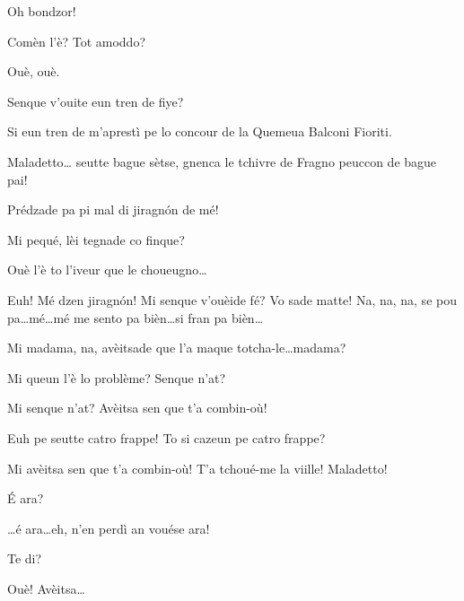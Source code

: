 \begin{drama}
\Saventaspeaks Oh bondzor!

\Cimaspeaks Comèn l'è? Tot amoddo?

\Saventaspeaks Ouè, ouè.

\Cimaspeaks Senque v'ouite eun tren de fiye?

\Saventaspeaks Si eun tren de m'aprestì pe lo concour de la Quemeua Balconi Fioriti.

\Cimaspeaks Maladetto\ldots {} seutte bague sètse, gnenca le tchivre de Fragno peuccon de bague pai!

\Saventaspeaks Prédzade pa pi mal di jiragn\'on de mé!

\Cimaspeaks Mi pequé, lèi tegnade co finque?

\Saventaspeaks Ouè l'è to l'iveur que le choueugno\ldots


\Saventaspeaks {} Euh! Mé dzen jiragn\'on! Mi senque v'ouèide fé? Vo sade matte! Na, na, na, se pou pa\ldots mé\ldots mé me sento pa bièn\ldots si fran pa bièn\ldots


\Cimaspeaks Mi madama, na, avèitsade que l'a maque totcha-le\ldots madama?

\Marcospeaks {} Mi queun l'è lo problème? Senque n'at?

\Cimaspeaks Mi senque n'at? Avèitsa sen que t'a combin-où!

\Marcospeaks Euh pe seutte catro frappe! To si cazeun pe catro frappe?

\Cimaspeaks Mi avèitsa  sen que t'a combin-où! T'a tchoué-me la viille! Maladetto!

\Marcospeaks \'E ara?

\Cimaspeaks  \ldots é ara\ldots eh, n'en perdì an vouése ara!

\Marcospeaks Te di?

\Cimaspeaks Ouè! Avèitsa\ldots



\end{drama}

